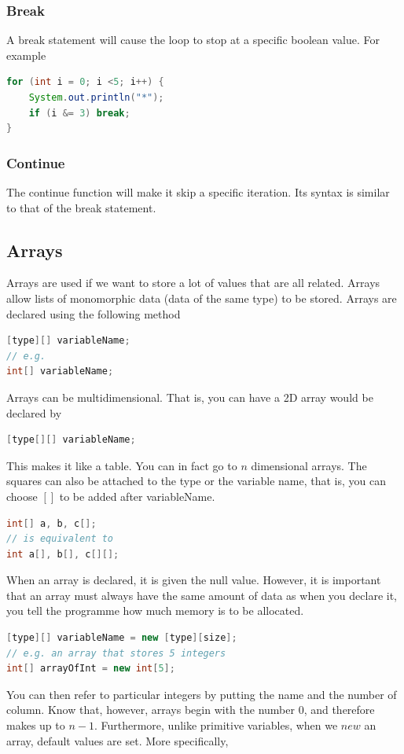 \documentclass[11pt,a4 paper]{book}
\theoremstyle{plain}
\theoremstyle{definition}
\theoremstyle{remark}
\begin{document}
\begin{flushleft}
\subsubsection{Break}
A break statement will cause the loop to stop at a specific boolean value. For example
\begin{lstlisting}[language = Java]
for (int i = 0; i <5; i++) {
	System.out.println("*");
	if (i &= 3) break;
}
\end{lstlisting}
\subsubsection{Continue}
The continue function will make it skip a specific iteration. Its syntax is similar to that of the break statement.
\subsection{Arrays}
Arrays are used if we want to store a lot of values that are all related. Arrays allow lists of monomorphic data (data of the same type) to be stored. Arrays are declared using the following method
\begin{lstlisting}[language = Java]
[type][] variableName;
// e.g.
int[] variableName;
\end{lstlisting}
Arrays can be multidimensional. That is, you can have a 2D array would be declared by
\begin{lstlisting}[language = Java]
[type[][] variableName;
\end{lstlisting}	
This makes it like a table. You can in fact go to $n$ dimensional arrays. The squares can also be attached to the type or the variable name, that is, you can choose $[]$ to be added after variableName.
\begin{lstlisting}[language = Java]
int[] a, b, c[];
// is equivalent to
int a[], b[], c[][];
\end{lstlisting}
When an array is declared, it is given the null value. However, it is important that an array must always have the same amount of data as when you declare it, you tell the programme how much memory is to be allocated. 
\begin{lstlisting}[language = Java]
[type][] variableName = new [type][size];
// e.g. an array that stores 5 integers
int[] arrayOfInt = new int[5];
\end{lstlisting}
You can then refer to particular integers by putting the name and the number of column. Know that, however, arrays begin with the number $0$, and therefore makes up to $n-1$. Furthermore, unlike primitive variables, when we $new$ an array, default values are set. More specifically,

\end{flushleft}
\end{document}
